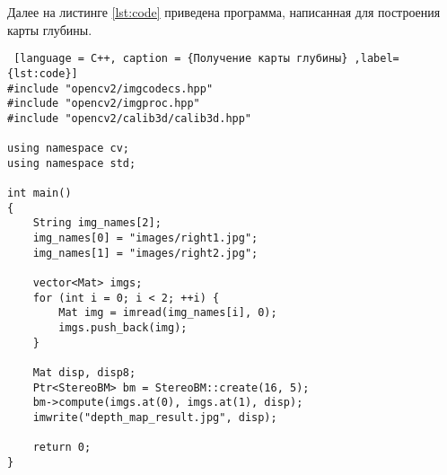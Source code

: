 Далее на листинге \ref{lst:code} приведена программа, написанная для построения карты глубины. 

\begin{lstlisting} [language = C++, caption = {Получение карты глубины} ,label={lst:code}]
#include "opencv2/imgcodecs.hpp"
#include "opencv2/imgproc.hpp"
#include "opencv2/calib3d/calib3d.hpp"

using namespace cv;
using namespace std;

int main()
{
	String img_names[2];
	img_names[0] = "images/right1.jpg"; 
	img_names[1] = "images/right2.jpg";
	
	vector<Mat> imgs;
	for (int i = 0; i < 2; ++i) {
		Mat img = imread(img_names[i], 0);
		imgs.push_back(img);
	}
	
	Mat disp, disp8;
	Ptr<StereoBM> bm = StereoBM::create(16, 5);
	bm->compute(imgs.at(0), imgs.at(1), disp);
	imwrite("depth_map_result.jpg", disp);
	
	return 0;
}
\end{lstlisting}